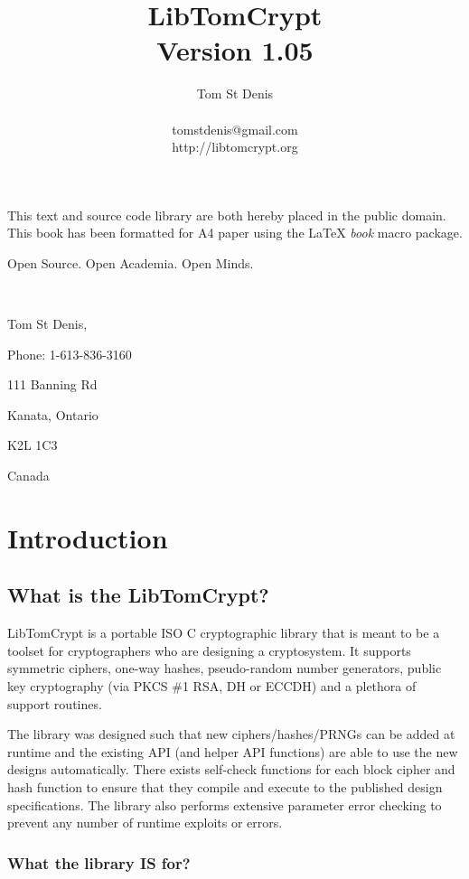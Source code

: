 \documentclass[a4paper]{book}
\begin{document}
\title{LibTomCrypt \\ Version 1.05}
\author{Tom St Denis \\
\\
tomstdenis@gmail.com \\
http://libtomcrypt.org
}
\maketitle
This text and source code library are both hereby placed in the public domain.  This book has been 
formatted for A4 paper using the \LaTeX{} {\em book} macro package.

\vspace{15cm}

\begin{flushright}Open Source.  Open Academia.  Open Minds.

\mbox{ }

Tom St Denis,

Phone: 1-613-836-3160

111 Banning Rd 

Kanata, Ontario 

K2L 1C3 

Canada
\end{flushright}
\newpage
\tableofcontents
\chapter{Introduction}
\section{What is the LibTomCrypt?}
LibTomCrypt is a portable ISO C cryptographic library that is meant to be a toolset for cryptographers who are 
designing a cryptosystem.  It supports symmetric ciphers, one-way hashes, pseudo-random number generators, 
public key cryptography (via PKCS \#1 RSA, DH or ECCDH) and a plethora of support 
routines.  

The library was designed such that new ciphers/hashes/PRNGs can be added at runtime and the existing API 
(and helper API functions) are able to use the new designs automatically.  There exists self-check functions for each 
block cipher and hash function to ensure that they compile and execute to the published design specifications.  The library 
also performs extensive parameter error checking to prevent any number of runtime exploits or errors.

\subsection{What the library IS for?}
\end{document}
